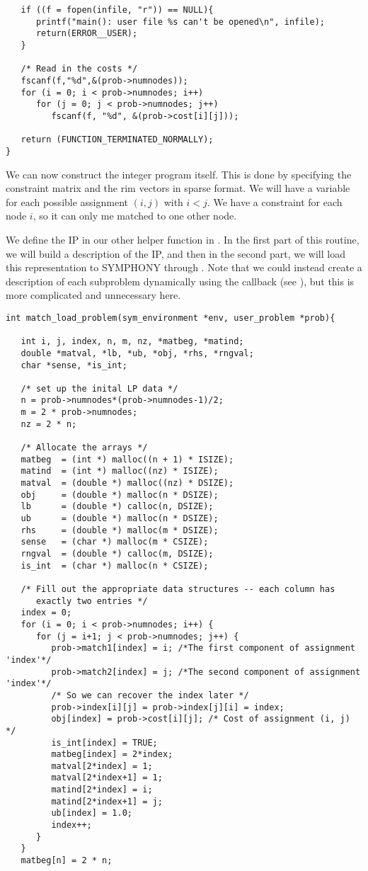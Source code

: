 {{\begin{verbatim}
   if ((f = fopen(infile, "r")) == NULL){
      printf("main(): user file %s can't be opened\n", infile);
      return(ERROR__USER); 
   }

   /* Read in the costs */
   fscanf(f,"%d",&(prob->numnodes));
   for (i = 0; i < prob->numnodes; i++)
      for (j = 0; j < prob->numnodes; j++)
         fscanf(f, "%d", &(prob->cost[i][j]));
   
   return (FUNCTION_TERMINATED_NORMALLY);
}
\end{verbatim}
}   

We can now construct the integer program itself. This is done by specifying
the constraint matrix and the rim vectors in sparse format. We will have a
variable for each possible assignment $(i,j)$ with $i<j$. We have a constraint
for each node $i$, so it can only me matched to one other node.

We define the IP in our other helper function 
in . In the first part of this routine, we will build a
description of the IP, and then in the second part, we will load this
representation to SYMPHONY through
. Note that we could instead create a
description of each subproblem dynamically using the
 callback (see ), but
this is more complicated and unnecessary here.

{\color{Brown}
\begin{verbatim}
int match_load_problem(sym_environment *env, user_problem *prob){
   
   int i, j, index, n, m, nz, *matbeg, *matind;
   double *matval, *lb, *ub, *obj, *rhs, *rngval;
   char *sense, *is_int;
   
   /* set up the inital LP data */
   n = prob->numnodes*(prob->numnodes-1)/2;
   m = 2 * prob->numnodes;
   nz = 2 * n;

   /* Allocate the arrays */
   matbeg  = (int *) malloc((n + 1) * ISIZE);
   matind  = (int *) malloc((nz) * ISIZE);
   matval  = (double *) malloc((nz) * DSIZE);
   obj     = (double *) malloc(n * DSIZE);
   lb      = (double *) calloc(n, DSIZE);
   ub      = (double *) malloc(n * DSIZE);
   rhs     = (double *) malloc(m * DSIZE);
   sense   = (char *) malloc(m * CSIZE);
   rngval  = (double *) calloc(m, DSIZE);
   is_int  = (char *) malloc(n * CSIZE);
   
   /* Fill out the appropriate data structures -- each column has
      exactly two entries */
   index = 0;
   for (i = 0; i < prob->numnodes; i++) {
      for (j = i+1; j < prob->numnodes; j++) {
         prob->match1[index] = i; /*The first component of assignment 'index'*/
         prob->match2[index] = j; /*The second component of assignment 'index'*/
         /* So we can recover the index later */
         prob->index[i][j] = prob->index[j][i] = index;
         obj[index] = prob->cost[i][j]; /* Cost of assignment (i, j) */
         is_int[index] = TRUE;
         matbeg[index] = 2*index;
         matval[2*index] = 1;
         matval[2*index+1] = 1;
         matind[2*index] = i;
         matind[2*index+1] = j;
         ub[index] = 1.0;
         index++;
      }
   }
   matbeg[n] = 2 * n;
   

\end{verbatim}}}
